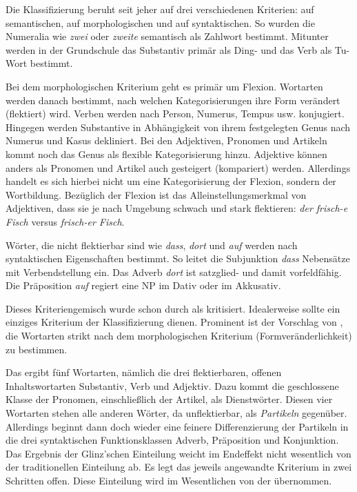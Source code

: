 Die Klassifizierung beruht seit jeher auf drei verschiedenen Kriterien: auf semantischen, auf morphologischen und auf syntaktischen. So wurden \zB die Numeralia wie \textit{zwei} oder \textit{zweite} semantisch als Zahlwort bestimmt. Mitunter werden in der Grundschule das Substantiv primär als Ding- und das Verb als Tu-Wort bestimmt. 

Bei dem morphologischen Kriterium geht es primär um Flexion. Wortarten werden danach bestimmt, nach welchen Kategorisierungen ihre Form verändert (flektiert) wird. Verben werden nach Person, Numerus, Tempus usw. konjugiert. Hingegen werden Substantive in Abhängigkeit von ihrem festgelegten Genus nach Numerus und Kasus dekliniert. Bei den Adjektiven, Pronomen und Artikeln kommt noch das Genus als flexible Kategorisierung hinzu. Adjektive können anders als Pronomen und Artikel auch gesteigert (kompariert) werden. Allerdings handelt es sich hierbei nicht um eine Kategorisierung der Flexion, sondern der Wortbildung. Bezüglich der Flexion ist das Alleinstellungsmerkmal von Adjektiven, dass sie je nach Umgebung schwach und stark flektieren: \textit{der frisch-e Fisch} versus \textit{frisch-er Fisch}.     

Wörter, die nicht flektierbar sind wie \zB \textit{dass}, \textit{dort} und \textit{auf} werden nach syntaktischen Eigenschaften bestimmt. So leitet die Subjunktion \textit{dass} Nebensätze mit Verbendstellung ein. Das Adverb \textit{dort} ist satzglied- und damit vorfeldfähig. Die Präposition \textit{auf} regiert eine NP im Dativ oder im Akkusativ. 

Dieses Kriteriengemisch wurde schon durch \citet[96]{Suetterlin1907} als  kritisiert. Idealerweise sollte ein einziges Kriterium der Klassifizierung dienen. Prominent ist der Vorschlag von \citet[53]{Glinz1962}, die Wortarten strikt nach dem morphologischen Kriterium (Formveränderlichkeit) zu bestimmen. 

Das ergibt fünf Wortarten, nämlich die drei flektierbaren, offenen Inhaltswortarten Substantiv, Verb und Adjektiv. Dazu kommt die geschlossene Klasse der Pronomen, einschließlich der Artikel, als Dienstwörter. Diesen vier Wortarten stehen alle anderen Wörter, da unflektierbar, als \textit{Partikeln} gegenüber. Allerdings beginnt dann doch wieder eine feinere Differenzierung der Partikeln in die drei syntaktischen Funktionsklassen Adverb, Präposition und Konjunktion. Das Ergebnis der Glinz'schen Einteilung weicht im Endeffekt nicht wesentlich von der traditionellen Einteilung ab. Es legt das jeweils angewandte Kriterium in zwei Schritten offen. Diese Einteilung wird im Wesentlichen von der \citet[§1005, 594]{Duden2022} übernommen.

